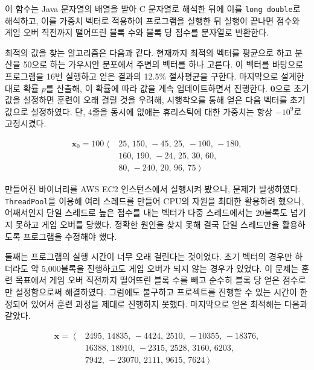 이 함수는 Java 문자열의 배열을 받아 C 문자열로 해석한 뒤에 이를 \texttt{long double}로 해석하고, 이를 가중치 벡터로 적용하여
프로그램을 실행한 뒤 실행이 끝나면 점수와 게임 오버 직전까지 떨어뜨린 블록 수와 블록 당 점수를 문자열로 반환한다.

최적의 값을 찾는 알고리즘은 다음과 같다. 현재까지 최적의 벡터를 평균으로 하고 분산을 50으로 하는 가우시안 분포에서 주변의 벡터를 하나 고른다.
이 벡터를 바탕으로 프로그램을 16번 실행하고 얻은 결과의 12.5\% 절사평균을 구한다. 마지막으로 설계한 대로 확률 $p$를 산출해, 이 확률에 따라 값을 계속 업데이트하면서 진행한다.
$\mathbf{0}$으로 초기값을 설정하면 훈련이 오래 걸릴 것을 우려해, 시행착오를 통해 얻은 다음 벡터를 초기값으로 설정하였다.
단, 4줄을 동시에 없애는 휴리스틱에 대한 가중치는 항상 $-10^9$로 고정시켰다.

\begin{align*}
    \mathbf{x}_0 = 100 \left<\right.& 25,\,150,\,-45,\,25,\,-100,\,-180, \\
    & 160,\,190,\,-24,\,25,\,30,\,60,\\
    & 80,\,-240,\,20,\,96,\,75 \left.\right>
\end{align*}

만들어진 바이너리를 AWS EC2 인스턴스에서 실행시켜 봤으나, 문제가 발생하였다.
\texttt{ThreadPool}을 이용해 여러 스레드를 만들어 CPU의 자원을 최대한
활용하려 했으나, 어째서인지 단일 스레드로 높은 점수를 내는 벡터가 다중 스레드에서는
20블록도 넘기지 못하고 게임 오버를 당했다. 정확한 원인을 찾지 못해 결국 단일 스레드만을
활용하도록 프로그램을 수정해야 했다.

둘째는 프로그램의 실행 시간이 너무 오래 걸린다는 것이었다. 초기 벡터의 경우만 하더라도
약 5,000블록을 진행하고도 게임 오버가 되지 않는 경우가 있었다. 이 문제는 훈련 목표에서
게임 오버 직전까지 떨어뜨린 블록 수를 빼고 순수히 블록 당 얻은 점수로만 설정함으로써
해결하였다. 그럼에도 불구하고 프로젝트를 진행할 수 있는 시간이 한정되어 있어서 훈련 과정을 제대로
진행하지 못했다. 마지막으로 얻은 최적해는 다음과 같았다.

\begin{align*}
    \mathbf{x} = \left<\right.& 2495,\,14835,\,-4424,\,2510,\,-10355,\,-18376, \\
    & 16388,\,18910,\,-2315,\,2528,\,3160,\,6203,\\
    & 7942,\,-23070,\,2111,\,9615,\,7624 \left.\right>
\end{align*}